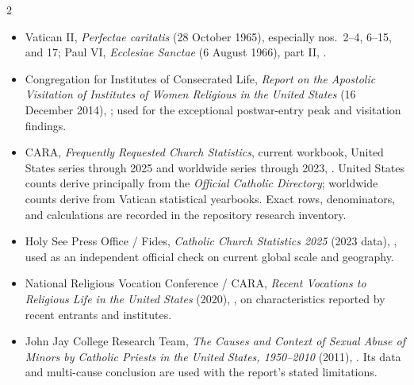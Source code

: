 \begin{multicols}{2}
{\footnotesize
\begin{itemize}[itemsep=0.1em,topsep=0.15em]
\item Vatican II, \emph{Perfectae caritatis} (28 October 1965), especially nos.~2--4, 6--15, and 17; Paul VI, \emph{Ecclesiae Sanctae} (6 August 1966), part II, .
\item Congregation for Institutes of Consecrated Life, \emph{Report on the Apostolic Visitation of Institutes of Women Religious in the United States} (16 December 2014), ; used for the exceptional postwar-entry peak and visitation findings.
\item CARA, \emph{Frequently Requested Church Statistics}, current workbook, United States series through 2025 and worldwide series through 2023, . United States counts derive principally from the \emph{Official Catholic Directory}; worldwide counts derive from Vatican statistical yearbooks. Exact rows, denominators, and calculations are recorded in the repository research inventory.
\item Holy See Press Office / Fides, \emph{Catholic Church Statistics 2025} (2023 data), , used as an independent official check on current global scale and geography.
\item National Religious Vocation Conference / CARA, \emph{Recent Vocations to Religious Life in the United States} (2020), , on characteristics reported by recent entrants and institutes.
\item John Jay College Research Team, \emph{The Causes and Context of Sexual Abuse of Minors by Catholic Priests in the United States, 1950--2010} (2011), . Its data and multi-cause conclusion are used with the report's stated limitations.
\end{itemize}}


\end{multicols}
